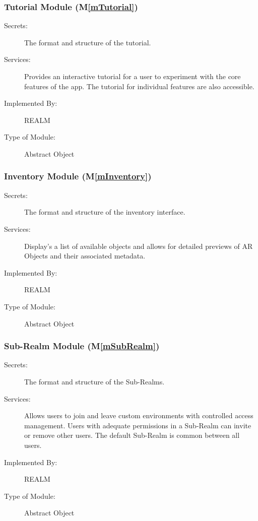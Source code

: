 \documentclass[12pt, titlepage]{article}
\newcommand{\mref}[1]{M\ref{#1}}
\begin{document}

\subsubsection{Tutorial Module (\mref{mTutorial})}

\begin{description}
\item[Secrets:]The format and structure of the tutorial.
\item[Services:]Provides an interactive tutorial for a user to experiment with the core features of the app. The tutorial for individual features are also accessible.
\item[Implemented By:]REALM
\item[Type of Module:]Abstract Object
\end{description}

\subsubsection{Inventory Module (\mref{mInventory})}

\begin{description}
\item[Secrets:]The format and structure of the inventory interface.
\item[Services:]Display's a list of available objects and allows for detailed previews of AR Objects and their associated metadata.
\item[Implemented By:]REALM
\item[Type of Module:]Abstract Object
\end{description}

\subsubsection{Sub-Realm Module (\mref{mSubRealm})}

\begin{description}
\item[Secrets:]The format and structure of the Sub-Realms.
\item[Services:]Allows users to join and leave custom environments with controlled access management. Users with adequate permissions in a Sub-Realm can invite or remove other users. The default Sub-Realm is common between all users.
\item[Implemented By:]REALM
\item[Type of Module:]Abstract Object
\end{description}
\end{document}
